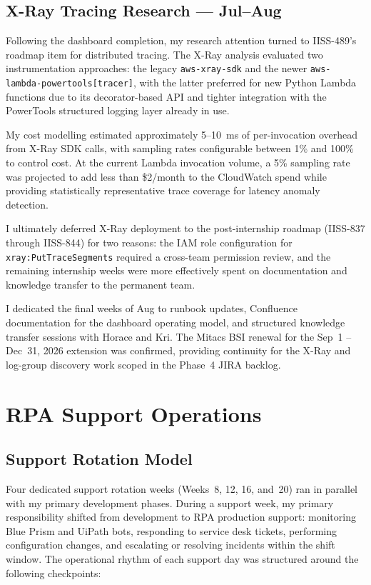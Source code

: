 \subsection{X-Ray Tracing Research --- Jul--Aug}

Following the dashboard completion, my research attention turned to IISS-489's
roadmap item for distributed tracing. The X-Ray analysis evaluated two
instrumentation approaches: the legacy \texttt{aws-xray-sdk} and the newer
\texttt{aws-lambda-powertools[tracer]}, with the latter preferred for new Python
Lambda functions due to its decorator-based API and tighter integration with the
PowerTools structured logging layer already in use.

My cost modelling estimated approximately 5--10~ms of per-invocation overhead
from X-Ray SDK calls, with sampling rates configurable between 1\% and 100\%
to control cost. At the current Lambda invocation volume, a 5\% sampling rate
was projected to add less than \$2/month to the CloudWatch spend while providing
statistically representative trace coverage for latency anomaly detection.

I ultimately deferred X-Ray deployment to the post-internship roadmap (IISS-837
through IISS-844) for two reasons: the IAM role configuration for
\texttt{xray:PutTraceSegments} required a cross-team permission review, and the
remaining internship weeks were more effectively spent on documentation and
knowledge transfer to the permanent team.

I dedicated the final weeks of Aug to runbook updates, Confluence documentation
for the dashboard operating model, and structured knowledge transfer sessions with
Horace and Kri. The Mitacs BSI renewal for the Sep~1 -- Dec~31, 2026
extension was confirmed, providing continuity for the X-Ray and log-group discovery
work scoped in the Phase~4 JIRA backlog.

\section{RPA Support Operations}
\label{sec:rpa_support}

\subsection{Support Rotation Model}

Four dedicated support rotation weeks (Weeks~8, 12, 16, and~20) ran in parallel
with my primary development phases. During a support week, my primary
responsibility shifted from development to RPA production support: monitoring
Blue Prism and UiPath bots, responding to service desk tickets,
performing configuration changes, and escalating or resolving incidents within
the shift window. The operational rhythm of each support day was structured
around the following checkpoints:


